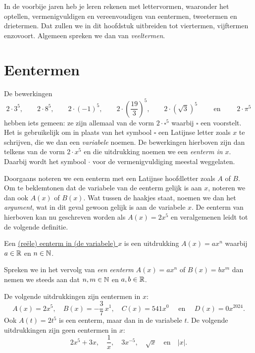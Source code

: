 \documentclass{ximera}
\begin{document}
	\author{Koen De Naeghel}
	\label{xim:veeltermen_eentermen}



In de voorbije jaren heb je leren rekenen met lettervormen, waaronder het optellen, ver\-menigvuldigen en vereenvoudigen van eentermen, tweetermen en drietermen. Dat zullen we in dit hoofdstuk uitbreiden tot viertermen, vijftermen enzovoort. Algemeen spreken we dan van {\em veeltermen}.

\section{Eentermen}

De bewerkingen
\[
2\cdot 3^5, \qquad 2\cdot 8^5, \qquad 2\cdot (-1)^5, \qquad 2\cdot\left(\frac{19}{3}\right)^5, \qquad 2\cdot\left(\sqrt{3}\right)^5 \qquad \text{ en } \qquad 2 \cdot \pi^5
\]
hebben iets gemeen: ze zijn allemaal van de vorm \( 2\cdot \square^5 \) waarbij \( \square \) een  voorstelt. Het is gebruikelijk om in plaats van het symbool \( \square \) een Latijnse letter zoals \( x \) te schrijven, die we dan een {\em variabele} noemen. De bewerkingen hierboven zijn dan telkens van de vorm \( 2 \cdot x^5 \) en die uitdrukking noemen we een {\em eenterm in \( x \)}. Daarbij wordt het symbool \( \cdot \) voor de vermenigvuldiging meestal weggelaten. 

Doorgaans noteren we een eenterm met een Latijnse hoofdletter zoals \( A \) of \( B \). Om te beklemtonen dat de variabele van de eenterm gelijk is aan \( x \), noteren we dan ook \( A(x) \) of \( B(x) \). Wat tussen de haakjes staat, noemen we dan het {\em argument}, wat in dit geval gewoon gelijk is aan de variabele \( x \). De eenterm van hierboven kan nu geschreven worden als \( A(x) = 2x^5 \) en veralgemenen leidt tot de volgende definitie.

\begin{definition}
Een \underline{(re\"ele) eenterm in (de variabele) \( x \)} is een uitdrukking \( A(x) = ax^n \) waarbij \( a \in \mathbb{R} \) en \( n \in \mathbb{N} \). 
\end{definition}

Spreken we in het vervolg van {\em een eenterm} \( A(x) = ax^n \) of \( B(x) = bx^m \) dan nemen we steeds aan dat \( n,m\in \mathbb{N} \) en \( a,b\in \mathbb{R} \).

\begin{example}
De volgende uitdrukkingen zijn eentermen in \( x \):
\[
A(x) = 2x^5, \quad B(x) = -\frac{3}{7}\,x^1, \quad C(x) = 541x^0 \quad \text{ en } \quad D(x) = 0x^{2024}.
\]
Ook \( A(t) = 2t^5 \) is een eenterm, maar dan in de variabele \( t \). De volgende uitdrukkingen zijn geen eentermen in \( x \):
\[
2x^5+3x, \quad \frac{1}{x}, \quad 3x^{-5}, \quad \sqrt{x} \quad \text{en} \quad \left|x\right|.
\] 
\end{example}
\end{document}
